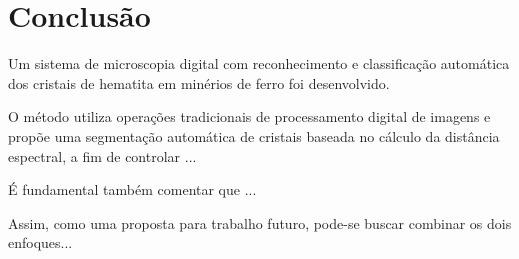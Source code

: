 
\chapter{Conclusão}

Um sistema de microscopia digital com reconhecimento e classificação
automática dos cristais de hematita em minérios de ferro foi
desenvolvido.

O método utiliza operações tradicionais de processamento digital de
imagens e propõe uma segmentação automática de cristais baseada no
cálculo da distância espectral, a fim de controlar ...

É fundamental também comentar que ...

Assim, como uma proposta para trabalho futuro, pode-se buscar combinar
os dois enfoques...
